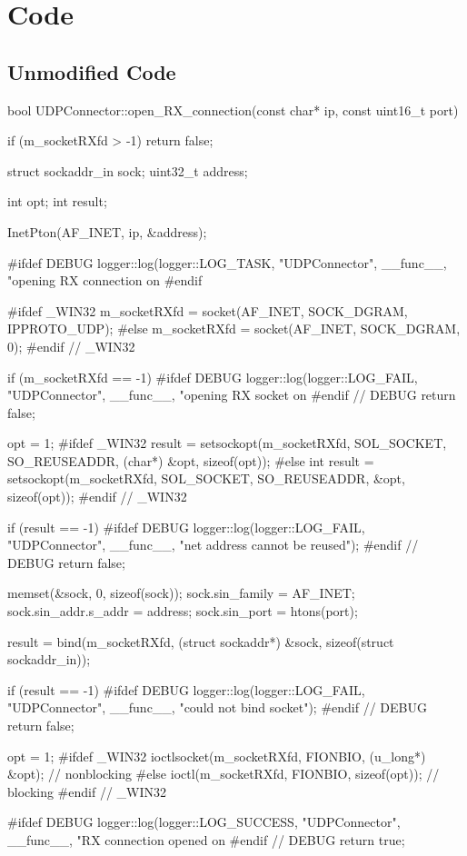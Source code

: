 \chapter{Code}\label{ax:code}

\section{Unmodified Code}\label{ax:code:fullcode}

\begin{codelist}{73}
bool UDPConnector::open_RX_connection(const char* ip, const uint16_t port) {
    if (m_socketRXfd > -1)
        return false;

    struct sockaddr_in sock;
    uint32_t address;

    int opt;
    int result;

    InetPton(AF_INET, ip, &address);

#ifdef DEBUG
    logger::log(logger::LOG_TASK, "UDPConnector", __func__, "opening RX connection on %
#endif

#ifdef _WIN32
    m_socketRXfd = socket(AF_INET, SOCK_DGRAM, IPPROTO_UDP);
#else
    m_socketRXfd = socket(AF_INET, SOCK_DGRAM, 0);
#endif  // _WIN32

    if (m_socketRXfd == -1) {
#ifdef DEBUG
        logger::log(logger::LOG_FAIL, "UDPConnector", __func__, "opening RX socket on %
#endif  // DEBUG
        return false;
    }

    opt = 1;
#ifdef _WIN32
    result = setsockopt(m_socketRXfd, SOL_SOCKET, SO_REUSEADDR, (char*) &opt, sizeof(opt));
#else
    int result   = setsockopt(m_socketRXfd, SOL_SOCKET, SO_REUSEADDR, &opt, sizeof(opt));
#endif  // _WIN32

    if (result == -1) {
#ifdef DEBUG
        logger::log(logger::LOG_FAIL, "UDPConnector", __func__, "net address cannot be reused");
#endif  // DEBUG
        return false;
    }

    memset(&sock, 0, sizeof(sock));
    sock.sin_family      = AF_INET;
    sock.sin_addr.s_addr = address;
    sock.sin_port        = htons(port);

    result = bind(m_socketRXfd, (struct sockaddr*) &sock, sizeof(struct sockaddr_in));

    if (result == -1) {
#ifdef DEBUG
        logger::log(logger::LOG_FAIL, "UDPConnector", __func__, "could not bind socket");
#endif  // DEBUG
        return false;
    }

    opt = 1;
#ifdef _WIN32
    ioctlsocket(m_socketRXfd, FIONBIO, (u_long*) &opt);  // nonblocking
#else
    ioctl(m_socketRXfd, FIONBIO, sizeof(opt));  // blocking
#endif  // _WIN32

#ifdef DEBUG
    logger::log(logger::LOG_SUCCESS, "UDPConnector", __func__, "RX connection opened on %
#endif  // DEBUG
    return true;
}
\end{codelist}

